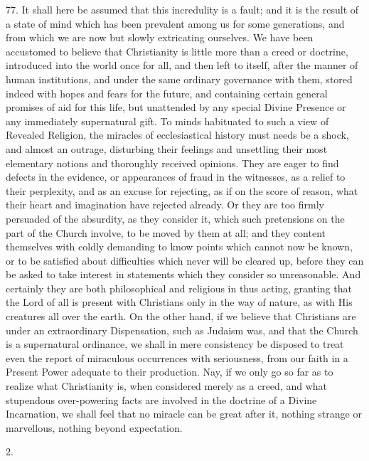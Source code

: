 77.
It shall here be assumed that this incredulity is a fault; and it is
the result of a state of mind which has been prevalent among us for
some generations, and from which we are now but slowly extricating
ourselves. We have been accustomed to believe that Christianity is
little more than a creed or doctrine, introduced into the world once
for all, and then left to itself, after the manner of human
institutions, and under the same ordinary governance with them, stored
indeed with hopes and fears for the future, and containing certain
general promises of aid for this life, but unattended by any special
Divine Presence or any immediately supernatural gift. To minds
habituated to such a view of Revealed Religion, the miracles of
ecclesiastical history must needs be a shock, and almost an outrage,
disturbing their feelings and unsettling their most elementary notions
and thoroughly received opinions. They are eager to find defects in
the evidence, or appearances of fraud in the witnesses, as a relief to
their perplexity, and as an excuse for rejecting, as if on the score
of reason, what their heart and imagination have rejected already. Or
they are too firmly persuaded of the absurdity, as they consider it,
which such pretensions on the part of the Church involve, to be moved
by them at all; and they content themselves with coldly
demanding to know points which cannot now be known, or to be satisfied
about difficulties which never will be cleared up, before they can be
asked to take interest in statements which they consider so
unreasonable. And certainly they are both philosophical and religious
in thus acting, granting that the Lord of all is present with
Christians only in the way of nature, as with His creatures all over
the earth. On the other hand, if we believe that Christians are under
an extraordinary Dispensation, such as Judaism was, and that the
Church is a supernatural ordinance, we shall in mere consistency be
disposed to treat even the report of miraculous occurrences with
seriousness, from our faith in a Present Power adequate to their
production. Nay, if we only go so far as to realize what Christianity
is, when considered merely as a creed, and what stupendous
over-powering facts are involved in the doctrine of a Divine
Incarnation, we shall feel that no miracle can be great after it,
nothing strange or marvellous, nothing beyond expectation.

2.

